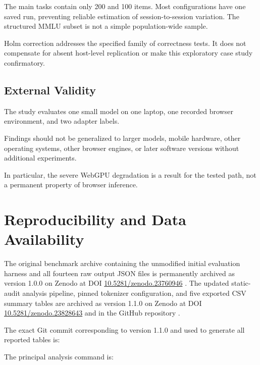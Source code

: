 \documentclass[conference]{IEEEtran}
\begin{document}
The main tasks contain only 200 and 100 items.
Most configurations have one saved run, preventing reliable
estimation of session-to-session variation.
The structured MMLU subset is not a simple population-wide
sample.

Holm correction addresses the specified family of
correctness tests.
It does not compensate for absent host-level replication
or make this exploratory case study confirmatory.


\subsection{External Validity}

The study evaluates one small model on one laptop,
one recorded browser environment, and two adapter labels.

Findings should not be generalized to larger models,
mobile hardware, other operating systems, other browser
engines, or later software versions without additional
experiments.

In particular, the severe WebGPU degradation is a result
for the tested path, not a permanent property of browser
inference.


\section{Reproducibility and Data Availability}
\label{sec:reproducibility}

The original benchmark archive containing the unmodified
initial evaluation harness and all fourteen raw output JSON
files is permanently archived as version 1.0.0 on Zenodo at
DOI
\href{https://doi.org/10.5281/zenodo.23760946}
{10.5281/zenodo.23760946}
\cite{archive}.
The updated static-audit analysis pipeline, pinned tokenizer
configuration, and five exported CSV summary tables are
archived as version 1.1.0 on Zenodo at DOI
\href{https://doi.org/10.5281/zenodo.23828643}
{10.5281/zenodo.23828643}
and in the GitHub repository \cite{repository}.

The exact Git commit corresponding to version 1.1.0 and used
to generate all reported tables is:

\begin{quote}
\footnotesize
{}
\end{quote}

The principal analysis command is:
\end{document}
